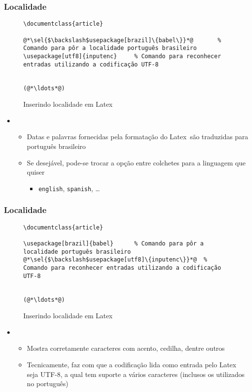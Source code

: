 \begin{frame}[fragile] \frametitle{Localidade}
\begin{figure}[!t]
\caption{Inserindo localidade em Latex}
\begin{lstlisting}
\documentclass{article}

@*\sel{$\backslash$usepackage[brazil]\{babel\}}*@		% Comando para pôr a localidade português brasileiro 
\usepackage[utf8]{inputenc} 	% Comando para reconhecer entradas utilizando a codificação UTF-8


(@*\ldots*@)
\end{lstlisting}
\ownsrc
\end{figure}

\begin{itemize}
	\item {}
	\begin{itemize}
		\item Datas e palavras fornecidas pela formatação do Latex~são traduzidas para português brasileiro
		\item Se desejável, pode-se trocar a opção entre colchetes para a linguagem que quiser
		\begin{itemize}
			\item \texttt{english}, \texttt{spanish}, \ldots
		\end{itemize}
	\end{itemize}
\end{itemize}
\end{frame}

\begin{frame}[fragile] \frametitle{Localidade}
\begin{figure}[!t]
\caption{Inserindo localidade em Latex}
\begin{lstlisting}
\documentclass{article}

\usepackage[brazil]{babel}		% Comando para pôr a localidade português brasileiro
@*\sel{$\backslash$usepackage[utf8]\{inputenc\}}*@ 	% Comando para reconhecer entradas utilizando a codificação UTF-8


(@*\ldots*@)
\end{lstlisting}
\ownsrc
\end{figure}

\begin{itemize}
	\item {}
	\begin{itemize}
		\item Mostra corretamente caracteres com acento, cedilha, dentre outros
		\item Tecnicamente, faz com que a codificação lida como entrada pelo Latex seja UTF-8, a qual tem suporte a vários caracteres (inclusos os utilizados no português)
	\end{itemize}
\end{itemize}
\end{frame}

